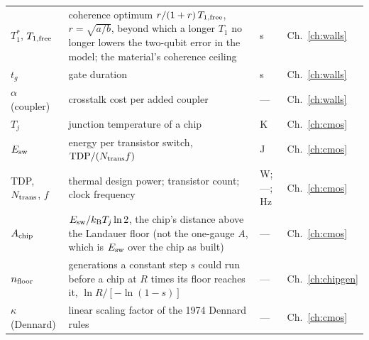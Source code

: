 {\begin{longtable}{@{}>{\raggedright\arraybackslash}p{}>{\raggedright\arraybackslash}p{}>{\raggedright\arraybackslash}p{}>{\raggedright\arraybackslash}p{}@{}}
$T_1^*$, $T_{1,\rm free}$ & coherence optimum $r/(1+r)\,T_{1,\rm free}$, $r=\sqrt{a/b}$, beyond which a longer $T_1$ no longer lowers the two-qubit error in the model; the material's coherence ceiling & s & Ch.~\ref{ch:walls}\\\iamrowrule
$t_g$ & gate duration & s & Ch.~\ref{ch:walls}\\\iamrowrule
$\alpha$ (coupler) & crosstalk cost per added coupler & --- & Ch.~\ref{ch:walls}\\\iamrowrule
$T_j$ & junction temperature of a chip & K & Ch.~\ref{ch:cmos}\\\iamrowrule
$E_{\rm sw}$ & energy per transistor switch, $\mathrm{TDP}/(N_{\rm trans}f)$ & J & Ch.~\ref{ch:cmos}\\\iamrowrule
TDP, $N_{\rm trans}$, $f$ & thermal design power; transistor count; clock frequency & W; ---; Hz & Ch.~\ref{ch:cmos}\\\iamrowrule
$A_{\rm chip}$ & $E_{\rm sw}/k_{\mathrm B} T_j\ln2$, the chip's distance above the Landauer floor (not the one-gauge $A$, which is $E_{\rm sw}$ over the chip as built) & --- & Ch.~\ref{ch:cmos}\\\iamrowrule
$n_{\rm floor}$ & generations a constant step $s$ could run before a chip at $R$ times its floor reaches it, $\ln R/[-\ln(1-s)]$ & --- & Ch.~\ref{ch:chipgen}\\\iamrowrule
$\kappa$ (Dennard) & linear scaling factor of the 1974 Dennard rules & --- & Ch.~\ref{ch:cmos}\\
\bottomrule\end{longtable}}
